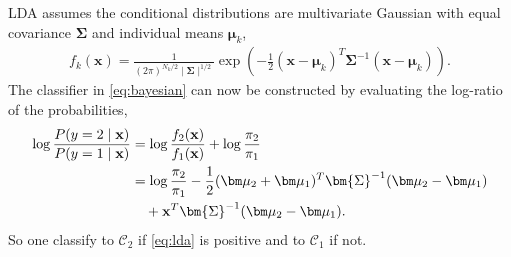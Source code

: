 LDA assumes the conditional distributions are multivariate Gaussian with equal covariance $\bm{\Sigma}$ and individual means $\bm\mu_k$,
\begin{align}
  f_k(\mathbf{x}) =  \frac{1}{(2\pi)^{N_k/2}\mid \bm{\Sigma}\mid ^{1/2}} \exp\left( -\frac{1}{2} (\mathbf{x}-\bm \mu_k)^T \bm{\Sigma}^{-1} (\mathbf{x}-\bm \mu_k)\right).
\end{align}
The classifier in \eqref{eq:bayesian} can now be constructed by evaluating the log-ratio of the probabilities,
\begin{align}
  \label{eq:lda} 
  \log{\frac{P(y=2\mid \mathbf{x})}{P(y=1\mid \mathbf{x})}} &= \log{\frac{f_2(\mathbf{x})}{f_1(\mathbf{x})} } + \log{\frac{\pi_2}{\pi_1} } \notag \ \\
  &= \log{\frac{\pi_2}{\pi_1}} -\frac{1}{2} (\bm \mu_2+\bm \mu_1)^T \bm{\Sigma}^{-1} (\bm \mu_2-\bm \mu_1) \\
  & \quad + \mathbf{x}^T\bm{\Sigma}^{-1} (\bm \mu_2-\bm \mu_1).
  \notag \ 
\end{align}
So one classify to $\mathcal{C}_2$ if \eqref{eq:lda} is positive and to $\mathcal{C}_1$ if not. 

